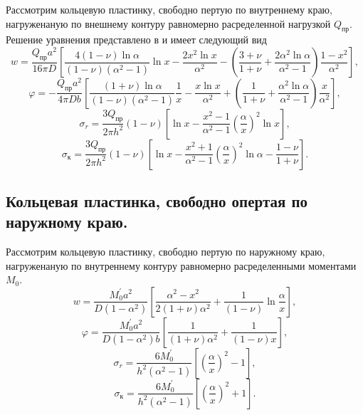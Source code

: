 Рассмотрим кольцевую пластинку, свободно пертую по внутреннему краю, нагруженаную по внешнему контуру равномерно расределенной нагрузкой $Q_{\text{пр}}$.
Решение уравнения представлено в и имеет следующий вид 
\begin{equation}
  \label{RingPlateForce_eq1}
    w=\frac{Q_{\text{пр}} a^2}{16 \pi D} \left[ \frac{4 \left( 1-\nu \right)\ln{\alpha}}{\left(1-\nu \right) \left({\alpha}^2 -1\right)}\ln{x} -\frac{2x^2 \ln{x}}{{\alpha}^2} -\left( \frac{3+\nu}{1+\nu}+\frac{2 {\alpha}^2 \ln{\alpha}}{{\alpha}^2 -1} \right)\frac{1-x^2}{{\alpha}^2} \right],
\end{equation}
\begin{equation}
  \label{RingPlateForce_eq2}
    \varphi=-\frac{Q_{\text{пр}} a^2}{4 \pi Db} \left[ \frac{\left( 1+\nu \right)\ln{\alpha}}{\left(1-\nu \right) \left({\alpha}^2 -1\right)} \frac{1}{x} -\frac{x \ln{x}}{{\alpha}^2} +\left( \frac{1}{1+\nu}+\frac{{\alpha}^2 \ln{\alpha}}{{\alpha}^2 -1} \right)\frac{x}{{\alpha}^2} \right],
\end{equation}
\begin{equation}
  \label{RingPlateForce_eq3}
    {\sigma}_r=\frac{3Q_{\text{пр}}}{2 \pi h^2} \left(1-\nu \right) \left[\ln{x}-\frac{x^2-1}{{\alpha}^2-1}  {\left(\frac{\alpha}{x} \right)}^2  \ln{x} \right],
\end{equation}
\begin{equation}
  \label{RingPlateForce_eq4}
    {\sigma}_{\text{к}}=\frac{3Q_{\text{пр}}}{2 \pi h^2} \left(1-\nu \right) \left[\ln{x}-\frac{x^2+1}{{\alpha}^2-1}  {\left(\frac{\alpha}{x} \right)}^2  \ln{\alpha} -\frac{1-\nu}{1+\nu} \right].
\end{equation}


\subsection{Кольцевая пластинка, свободно опертая по наружному краю.}
\label{RingPlateMoment}

Рассмотрим кольцевую пластинку, свободно пертую по наружному краю, нагруженаную по внутреннему контуру равномерно расределенными моментами $M_0$.
\begin{equation}
  \label{RingPlateMoment_eq1}
    w=\frac{M_0^{\prime} a^2}{D \left(1-{\alpha}^2 \right)} \left[ \frac{{\alpha}^2 -x^2}{2 \left(1+\nu \right) {\alpha}^2}+\frac{1}{\left(1-\nu \right)}\ln{\frac{\alpha}{x}} \right],
\end{equation}
\begin{equation}
  \label{RingPlateMoment_eq2}
    \varphi=\frac{M_0^{\prime} a^2}{D \left(1-{\alpha}^2 \right)b} \left[ \frac{1}{\left(1+\nu \right) {\alpha}^2}+\frac{1}{\left(1-\nu \right)x} \right],
\end{equation}
\begin{equation}
  \label{RingPlateMoment_eq3}
    {\sigma}_r=\frac{6M_0^{\prime}}{h^2 \left( {\alpha}^2-1 \right)} \left[ \left(\frac{\alpha}{x}\right)^2  -1 \right],
\end{equation}
\begin{equation}
  \label{RingPlateMoment_eq4}
    {\sigma}_{\text{к}}=\frac{6M_0^{\prime}}{h^2 \left( {\alpha}^2-1 \right)} \left[ \left(\frac{\alpha}{x}\right)^2  +1 \right].
\end{equation}


